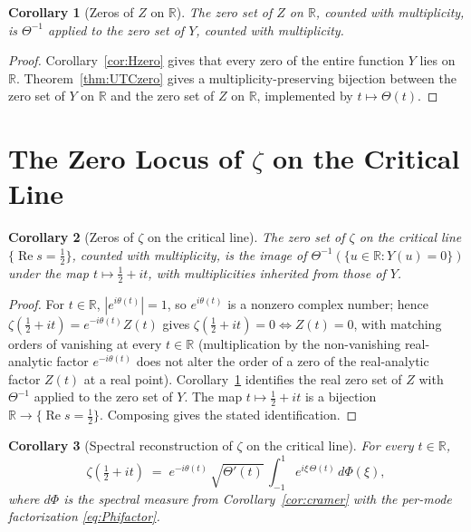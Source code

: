 \documentclass[11pt]{article}
\newtheorem{corollary}{Corollary}
\DeclareMathOperator{\ReOp}{Re}
\let\Re\ReOp
\begin{document}
\begin{corollary}[Zeros of $Z$ on $\mathbb{R}$]\label{cor:Zreal}
The zero set of $Z$ on $\mathbb{R}$, counted with multiplicity, is $\Theta^{-1}$ applied to the zero set of $Y$, counted with multiplicity.
\end{corollary}

\begin{proof}
Corollary~\ref{cor:Hzero} gives that every zero of the entire function $Y$ lies on $\mathbb{R}$. Theorem~\ref{thm:UTCzero} gives a multiplicity-preserving bijection between the zero set of $Y$ on $\mathbb{R}$ and the zero set of $Z$ on $\mathbb{R}$, implemented by $t\mapsto\Theta(t)$.
\end{proof}

\section{The Zero Locus of $\zeta$ on the Critical Line}

\begin{corollary}[Zeros of $\zeta$ on the critical line]\label{cor:Zeta-crit}
The zero set of $\zeta$ on the critical line $\{\Re s=\tfrac{1}{2}\}$, counted with multiplicity, is the image of $\Theta^{-1}(\{u\in\mathbb{R}:Y(u)=0\})$ under the map $t\mapsto\tfrac{1}{2}+it$, with multiplicities inherited from those of $Y$.
\end{corollary}

\begin{proof}
For $t\in\mathbb{R}$, $|e^{i\theta(t)}|=1$, so $e^{i\theta(t)}$ is a nonzero complex number; hence $\zeta(\tfrac{1}{2}+it)=e^{-i\theta(t)}Z(t)$ gives $\zeta(\tfrac{1}{2}+it)=0 \iff Z(t)=0$, with matching orders of vanishing at every $t\in\mathbb{R}$ (multiplication by the non-vanishing real-analytic factor $e^{-i\theta(t)}$ does not alter the order of a zero of the real-analytic factor $Z(t)$ at a real point). Corollary~\ref{cor:Zreal} identifies the real zero set of $Z$ with $\Theta^{-1}$ applied to the zero set of $Y$. The map $t\mapsto\tfrac{1}{2}+it$ is a bijection $\mathbb{R}\to\{\Re s=\tfrac{1}{2}\}$. Composing gives the stated identification.
\end{proof}

\begin{corollary}[Spectral reconstruction of $\zeta$ on the critical line]\label{cor:Zeta-recon}
For every $t\in\mathbb R$,
\begin{equation}\label{eq:Zeta-recon}
\zeta(\tfrac{1}{2}+it)\;=\;e^{-i\theta(t)}\,\sqrt{\Theta'(t)}\,\int_{-1}^{1}e^{i\xi\,\Theta(t)}\,d\Phi(\xi),
\end{equation}
where $d\Phi$ is the spectral measure from Corollary~\ref{cor:cramer} with the per-mode factorization \eqref{eq:Phifactor}.
\end{corollary}
\end{document}
